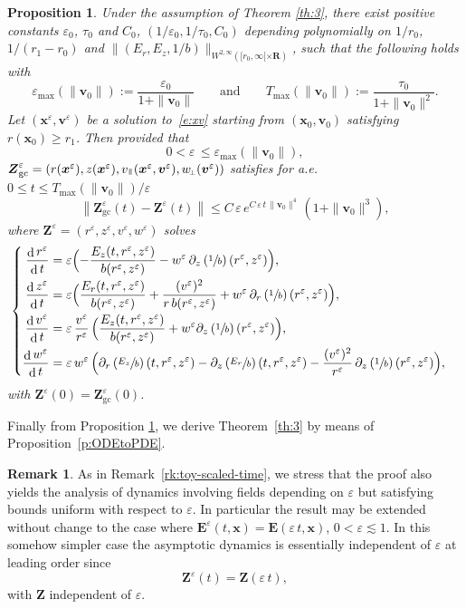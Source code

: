 \documentclass[10pt]{amsart}
\newenvironment{splitcases}
{\begin{cases}\begin{aligned}}
{\end{aligned}\end{cases}}
\newcommand{\sperp}{{\scriptscriptstyle\perp}}
\let\eps\varepsilon
\let\d\partial
\DeclareMathOperator\dD{d}\let\dd\dD
\theoremstyle{plain}
\newtheorem{proposition}[theorem]{Proposition}
\theoremstyle{definition}
\newtheorem{remark}[theorem]{Remark}
\newcommand\br{\begin{remark}}
\newcommand\er{\end{remark}}
\newcommand{\bpr}{\begin{proposition}}
\newcommand{\epr}{\end{proposition}}
\newcommand\R{\mathbf R}
\newcommand\bE{{\boldsymbol E}}
\newcommand\bfv{{\boldsymbol v}}
\newcommand\bfx{{\boldsymbol x}}
\newcommand\bfZ{{\boldsymbol Z}}
\newcommand\vpar{v_\mypar}
\newcommand\eperp{w_{\!\sperp}}
\let\e w
\newcommand\Er{E_r}
\newcommand\Ez{E_z}
\newcommand{\ZGC}{\bfZ_\mathrm{gc}}
\newcommand{\mypar}{{\mkern3mu\vphantom{\perp}\vrule depth 0pt\mkern2mu\vrule depth 0pt\mkern3mu}}
\begin{document}
\bpr
\label{rzve}
Under the assumption of Theorem \ref{th:3}, there exist positive constants $\eps_0$, $\tau_0$ and $C_0$, $(1/\eps_0,1/\tau_0,C_0)$ depending polynomially on $1/r_0$, $1/(r_1-r_0)$ and $\|(\Er,\Ez,1/b)\|_{W^{2,\infty}([r_0,\infty[\times\R)}$, such that the following holds with
\[
\eps_{\max}(\|\bfv_0\|):=\frac{\eps_0}{1+\|\bfv_0\|}\qquad\textrm{and}\qquad
T_{\max}(\|\bfv_0\|):=\frac{\tau_0}{1+\|\bfv_0\|^2}.
\]
Let $(\bfx^\eps,\bfv^\eps)$ be a solution to~\eqref{e:xv} starting from
$(\bfx_0,\bfv_0)$ satisfying $r(\bfx_0)\geq r_1$. Then provided that
\[0<\eps\,\leq \eps_{\max}(\|\bfv_0\|),
\]
$\ZGC^\eps=(r(\bfx^\eps), z(\bfx^\eps), \vpar(\bfx^\eps,\bfv^\eps), \eperp(\bfv^\eps))$ satisfies for a.e. $0\leq t\leq T_{\max}(\|\bfv_0\|)/\eps$
\[
\left\|\ZGC^\eps(t)-\bfZ^\eps(t)\right\|
\leq C\,\eps\,e^{C\,\eps\,t\,\|\bfv_0\|^4}
\,(1+\|\bfv_0\|^3),
\]
where $\bfZ^\eps=(r^\eps,z^\eps,v^\eps,\e^\eps)$ solves
\[
\begin{splitcases}
\frac{\dD r^\eps}{\dD t}&=\eps\Bigl(-\frac{\Ez(t,r^\eps,z^\eps)}{b(r^\eps,z^\eps)}-\e^\eps\,\d_z\left(\sfrac1b\right)(r^\eps,z^\eps)\Bigr),
\\
\frac{\dD z^\eps}{\dD t}&=
\eps\Bigl(\frac{\Er(t,r^\eps,z^\eps)}{b(r^\eps,z^\eps)}+\frac{(v^\eps)^2}{r\,b(r^\eps,z^\eps)}
+\e^\eps\,\d_r\left(\sfrac1b\right)(r^\eps,z^\eps)\Bigr),
\\
\frac{\dD v^\eps}{\dD t}
&=
\eps\,\frac{v^\eps}{r^\eps}\,\Bigl(\frac{\Ez(t,r^\eps,z^\eps)}{b(r^\eps,z^\eps)}
+\e^\eps\d_z\left(\sfrac1b\right)(r^\eps,z^\eps)\Bigr),
\\
\frac{\dD \e^\eps}{\dD t}
&=
\eps\,\e^\eps\,
\Bigl(\d_r\left(\sfrac{\Ez}{b}\right)(t,r^\eps,z^\eps)-\d_z\left(\sfrac{\Er}{b}\right)(t,r^\eps,z^\eps)
-\frac{(v^\eps)^2}{r^\eps}\,\d_z\left(\sfrac1b\right)(r^\eps,z^\eps)\Bigr),
\end{splitcases}
\]
with $\bfZ^\eps(0)=\ZGC^\eps(0)$.
\epr

Finally from Proposition \ref{rzve}, we derive Theorem~\ref{th:3} by means of Proposition~\ref{p:ODEtoPDE}.

\br\label{rk:scaled-time}
As in Remark~\ref{rk:toy-scaled-time}, we stress that the proof also yields the analysis of dynamics involving fields depending on $\eps$ but satisfying bounds uniform with respect to $\eps$. In particular the result may be extended without change to the case where $\bE^\eps(t,\bfx)=\bE(\eps\,t,\bfx)$, $0<\eps\lesssim 1$. In this somehow simpler case the asymptotic dynamics is essentially independent of $\eps$ at leading order since\vspace*{-3pt}\enlargethispage{\baselineskip}%
\[
\bfZ^\eps(t)=\bfZ(\eps\,t),
\]
with $\bfZ$ independent of $\eps$.
\er
\end{document}
